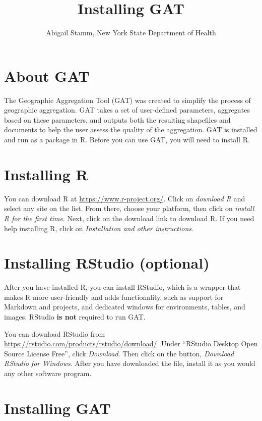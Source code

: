 \documentclass[
]{article}
\title{Installing GAT}
\author{Abigail Stamm, New York State Department of Health}
\date{}
\begin{document}
\maketitle

{
\setcounter{tocdepth}{2}
\tableofcontents
}
\hypertarget{about-gat}{%
\section{About GAT}\label{about-gat}}

The Geographic Aggregation Tool (GAT) was created to simplify the
process of geographic aggregation. GAT takes a set of user-defined
parameters, aggregates based on these parameters, and outputs both the
resulting shapefiles and documents to help the user assess the quality
of the aggregation. GAT is installed and run as a package in R. Before
you can use GAT, you will need to install R.

\hypertarget{installing-r}{%
\section{Installing R}\label{installing-r}}

You can download R at \url{https://www.r-project.org/}. Click on
\emph{download R} and select any site on the list. From there, choose
your platform, then click on \emph{install R for the first time}. Next,
click on the download link to download R. If you need help installing R,
click on \emph{Installation and other instructions}.

\hypertarget{installing-rstudio-optional}{%
\section{Installing RStudio
(optional)}\label{installing-rstudio-optional}}

After you have installed R, you can install RStudio, which is a wrapper
that makes R more user-friendly and adds functionality, such as support
for Markdown and projects, and dedicated windows for environments,
tables, and images. RStudio \textbf{is not} required to run GAT.

You can download RStudio from
\url{https://rstudio.com/products/rstudio/download/}. Under ``RStudio
Desktop Open Source License Free'', click \emph{Download}. Then click on
the button, \emph{Download RStudio for Windows}. After you have
downloaded the file, install it as you would any other software program.

\hypertarget{installing-gat}{%
\section{Installing GAT}\label{installing-gat}}
\end{document}
